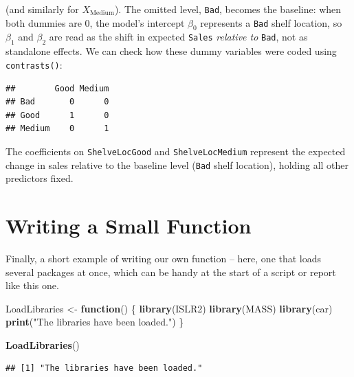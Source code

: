 \documentclass[
  11pt,
]{article}
\newenvironment{Shaded}{\begin{snugshade}}{\end{snugshade}}
\newcommand{\ControlFlowTok}[1]{\textcolor[rgb]{0.13,0.29,0.53}{\textbf{#1}}}
\newcommand{\FunctionTok}[1]{\textcolor[rgb]{0.13,0.29,0.53}{\textbf{#1}}}
\newcommand{\NormalTok}[1]{#1}
\newcommand{\OtherTok}[1]{\textcolor[rgb]{0.56,0.35,0.01}{#1}}
\newcommand{\SpecialCharTok}[1]{\textcolor[rgb]{0.81,0.36,0.00}{\textbf{#1}}}
\newcommand{\StringTok}[1]{\textcolor[rgb]{0.31,0.60,0.02}{#1}}
\begin{document}
(and similarly for \(X_{\text{Medium}}\)). The omitted level,
\texttt{Bad}, becomes the baseline: when both dummies are 0, the model's
intercept \(\beta_0\) represents a \texttt{Bad} shelf location, so
\(\beta_1\) and \(\beta_2\) are read as the shift in expected
\texttt{Sales} \emph{relative to} \texttt{Bad}, not as standalone
effects. We can check how these dummy variables were coded using
\texttt{contrasts()}:

\begin{Shaded}
\end{Shaded}

\begin{verbatim}
##        Good Medium
## Bad       0      0
## Good      1      0
## Medium    0      1
\end{verbatim}

The coefficients on \texttt{ShelveLocGood} and \texttt{ShelveLocMedium}
represent the expected change in sales relative to the baseline level
(\texttt{Bad} shelf location), holding all other predictors fixed.

\section{Writing a Small Function}\label{writing-a-small-function}

Finally, a short example of writing our own function -- here, one that
loads several packages at once, which can be handy at the start of a
script or report like this one.

\begin{Shaded}
\begin{Highlighting}[]
\NormalTok{LoadLibraries }\OtherTok{\textless{}{-}} \ControlFlowTok{function}\NormalTok{() \{}
  \FunctionTok{library}\NormalTok{(ISLR2)}
  \FunctionTok{library}\NormalTok{(MASS)}
  \FunctionTok{library}\NormalTok{(car)}
  \FunctionTok{print}\NormalTok{(}\StringTok{"The libraries have been loaded."}\NormalTok{)}
\NormalTok{\}}

\FunctionTok{LoadLibraries}\NormalTok{()}
\end{Highlighting}
\end{Shaded}

\begin{verbatim}
## [1] "The libraries have been loaded."
\end{verbatim}
\end{document}
